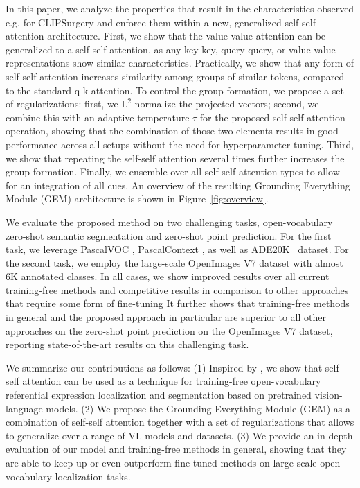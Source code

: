 \documentclass[10pt,twocolumn,letterpaper]{article}
\begin{document}
In this paper, we analyze the properties that result in the characteristics observed e.g. for CLIPSurgery and enforce them within a new, generalized self-self attention architecture. 
First, we show that the value-value attention can be generalized to a self-self attention, as any key-key, query-query, or value-value representations show similar characteristics.
Practically, we show that any form of self-self attention increases similarity among groups of similar tokens, compared to the standard q-k attention. 
To control the group formation, we propose a set of regularizations: first, we $\text{L}^{2}$ normalize the projected vectors; second, we combine this with an adaptive temperature $\tau$ for the proposed self-self attention operation, showing that the combination of those two elements results in good performance across all setups without the need for hyperparameter tuning.
Third, we show that repeating the self-self attention several times further increases the group formation. Finally, we ensemble over all self-self attention types to allow for an integration of all cues. 
An overview of the resulting Grounding Everything Module (GEM) architecture is shown in Figure~\ref{fig:overview}.


We evaluate the proposed method on two challenging tasks, open-vocabulary zero-shot semantic segmentation and zero-shot point prediction. For the first task, we leverage PascalVOC \citep{everingham2010pascal}, PascalContext \citep{mottaghi2014role}, as well as ADE20K~\citep{zhou2019sADE} dataset. For the second task, we employ the large-scale OpenImages V7 \citep{benenson2022colouring} dataset with almost 6K annotated classes. In all cases, we show improved results over all current training-free methods \citep{li2023clipsurgery, zhou2022extract} and competitive results in comparison to other approaches that require some form of fine-tuning \citep{xu2022groupvit, xu2023learning, luo2023segclip} 
It further shows that training-free methods in general and the proposed approach in particular are superior to all other approaches on the zero-shot point prediction on the OpenImages V7 dataset, reporting state-of-the-art results on this challenging task.

We summarize our contributions as follows:
(1) Inspired by \citet{li2023clipsurgery}, we show that self-self attention can be used as a technique for training-free open-vocabulary referential expression localization and segmentation based on pretrained vision-language models. 
(2) We propose the Grounding Everything Module (GEM) as a combination of self-self attention together with a set of regularizations that allows to generalize over a range of VL models and datasets.
(3) We provide an in-depth evaluation of our model and training-free methods in general, showing that they are able to keep up or even outperform fine-tuned methods on large-scale open vocabulary localization tasks.
 
\end{document}
